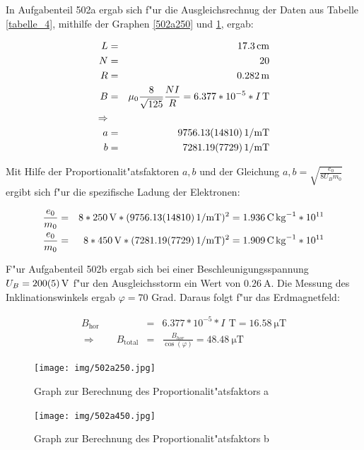 		In Aufgabenteil 502a ergab sich f"ur die Ausgleichsrechnug der Daten aus Tabelle \ref{tabelle_4}, mithilfe der Graphen \ref{502a250} und \ref{502a450}, ergab:

		\begin{eqnarray*}
			L &=& \SI{17.3}{\centi\meter}\\
			N &=& 20\\
			R &=& \SI{0.282}{\meter}\\
			B &=& \mu_0 \frac{8}{\sqrt{125}} \frac{NI}{R} = 6.377*10^{-5}*I\,\SI{}{\tesla}\\
			\Rightarrow\\
			a &=& \SI{9756.13 (14810)}{1\per\meter\tesla}\\
			b &=& \SI{7281.19 (7729)}{1\per\meter\tesla}
		\end{eqnarray*}

		Mit Hilfe der Proportionalit"atsfaktoren $a, b$ und der Gleichung $a, b = \sqrt{\frac{e_0}{8 U_B m_0}}$ ergibt sich f"ur die spezifische Ladung der Elektronen:

		\begin{eqnarray*}
			\frac{e_0}{m_0} &=& 8*\SI{250}{\volt}*(\SI{9756.13 (14810)}{1\per\meter\tesla})^2 = \SI{1.936}{\coulomb\per\kilo\gram}*10^{11}\\
			\frac{e_0}{m_0} &=& 8*\SI{450}{\volt}*(\SI{7281.19 (7729)}{1\per\meter\tesla})^2 = \SI{1.909}{\coulomb\per\kilo\gram}*10^{11}
		\end{eqnarray*}

		F"ur Aufgabenteil 502b ergab sich bei einer Beschleunigungsspannung $U_B = \SI{200 (5)}{\volt}$ f"ur den Ausgleichsstorm ein Wert von $\SI{0.26}{\ampere}$. Die Messung des Inklinationswinkels ergab $\varphi = 70$ Grad. Daraus folgt f"ur das Erdmagnetfeld:

		\begin{eqnarray*}
			B_\mathrm{hor} &=& 6.377*10^{-5}*I\,\SI{}{\tesla} = \SI{16.58}{\micro\tesla}\\
			\Rightarrow \qquad B_\mathrm{total} &=& \frac{B_{hor}}{\cos(\varphi)} = \SI{48.48}{\micro\tesla}
		\end{eqnarray*}


		\newpage

		

		\begin{figure}[h]
			\centering
			\texttt{[image: img/502a250.jpg]}
			\caption{Graph zur Berechnung des Proportionalit"atsfaktors a}
			\label{502a250}

			\texttt{[image: img/502a450.jpg]}
			\caption{Graph zur Berechnung des Proportionalit"atsfaktors b}
			\label{502a450}
		\end{figure}		

		\newpage